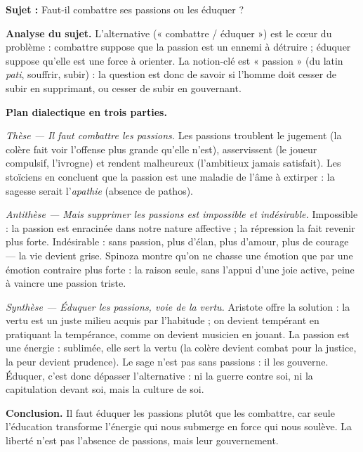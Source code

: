 \documentclass[11pt]{article}
\begin{document}
\begin{exoresolu}
\textbf{Sujet :} Faut-il combattre ses passions ou les éduquer ?

\tcblower

\textbf{Analyse du sujet.} L'alternative (« combattre / éduquer ») est le cœur du problème : combattre suppose que la passion est un ennemi à détruire ; éduquer suppose qu'elle est une force à orienter. La notion-clé est « passion » (du latin \emph{pati}, souffrir, subir) : la question est donc de savoir si l'homme doit cesser de subir en supprimant, ou cesser de subir en gouvernant.

\textbf{Plan dialectique en trois parties.}

\emph{Thèse — Il faut combattre les passions.} Les passions troublent le jugement (la colère fait voir l'offense plus grande qu'elle n'est), asservissent (le joueur compulsif, l'ivrogne) et rendent malheureux (l'ambitieux jamais satisfait). Les stoïciens en concluent que la passion est une maladie de l'âme à extirper : la sagesse serait l'\emph{apathie} (absence de pathos).

\emph{Antithèse — Mais supprimer les passions est impossible et indésirable.} Impossible : la passion est enracinée dans notre nature affective ; la répression la fait revenir plus forte. Indésirable : sans passion, plus d'élan, plus d'amour, plus de courage — la vie devient grise. Spinoza montre qu'on ne chasse une émotion que par une émotion contraire plus forte : la raison seule, sans l'appui d'une joie active, peine à vaincre une passion triste.

\emph{Synthèse — Éduquer les passions, voie de la vertu.} Aristote offre la solution : la vertu est un juste milieu acquis par l'habitude ; on devient tempérant en pratiquant la tempérance, comme on devient musicien en jouant. La passion est une énergie : sublimée, elle sert la vertu (la colère devient combat pour la justice, la peur devient prudence). Le sage n'est pas sans passions : il les gouverne. Éduquer, c'est donc dépasser l'alternative : ni la guerre contre soi, ni la capitulation devant soi, mais la culture de soi.

\textbf{Conclusion.} Il faut éduquer les passions plutôt que les combattre, car seule l'éducation transforme l'énergie qui nous submerge en force qui nous soulève. La liberté n'est pas l'absence de passions, mais leur gouvernement.
\end{exoresolu}
\end{document}
